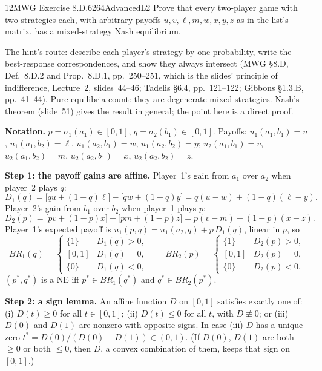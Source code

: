 \begin{exsol}{12}{MWG Exercise 8.D.6}{264}{Advanced}{L2}
\asked Prove that every two-player game with two strategies each, with arbitrary payoffs
$u, v, \ell, m, w, x, y, z$ as in the list's matrix, has a mixed-strategy Nash equilibrium.

\method The hint's route: describe each player's strategy by one probability, write the
best-response correspondences, and show they always intersect (MWG \S8.D, Def.~8.D.2 and
Prop.~8.D.1, pp.~250--251, which is the slides' principle of indifference, Lecture~2,
slides~44--46; Tadelis \S6.4, pp.~121--122; Gibbons \S1.3.B, pp.~41--44). Pure equilibria count:
they are degenerate mixed strategies. Nash's theorem (slide~51) gives the result in general; the
point here is a direct proof.

\solution
\textbf{Notation.} $p = \sigma_1(a_1) \in [0,1]$, $q = \sigma_2(b_1) \in [0,1]$. Payoffs:
$u_1(a_1,b_1) = u$, $u_1(a_1,b_2) = \ell$, $u_1(a_2,b_1) = w$, $u_1(a_2,b_2) = y$;
$u_2(a_1,b_1) = v$, $u_2(a_1,b_2) = m$, $u_2(a_2,b_1) = x$, $u_2(a_2,b_2) = z$.

\textbf{Step 1: the payoff gains are affine.} Player~1's gain from $a_1$ over $a_2$ when player~2
plays $q$:
\[
  D_1(q) = \big[qu + (1-q)\ell\big] - \big[qw + (1-q)y\big] = q(u - w) + (1-q)(\ell - y). \tag{1}
\]
Player~2's gain from $b_1$ over $b_2$ when player~1 plays $p$:
\[
  D_2(p) = \big[pv + (1-p)x\big] - \big[pm + (1-p)z\big] = p(v - m) + (1-p)(x - z). \tag{2}
\]
Player~1's expected payoff is $u_1(p,q) = u_1(a_2,q) + p\,D_1(q)$, linear in $p$, so
\[
  BR_1(q) = \begin{cases} \{1\} & D_1(q) > 0,\\ [0,1] & D_1(q) = 0,\\ \{0\} & D_1(q) < 0,\end{cases}
  \qquad
  BR_2(p) = \begin{cases} \{1\} & D_2(p) > 0,\\ [0,1] & D_2(p) = 0,\\ \{0\} & D_2(p) < 0.\end{cases} \tag{3}
\]
$(p^*, q^*)$ is a NE iff $p^* \in BR_1(q^*)$ and $q^* \in BR_2(p^*)$.

\textbf{Step 2: a sign lemma.} An affine function $D$ on $[0,1]$ satisfies exactly one of:
(i) $D(t) \ge 0$ for all $t \in [0,1]$; (ii) $D(t) \le 0$ for all $t$, with $D \not\equiv 0$; or
(iii) $D(0)$ and $D(1)$ are nonzero with opposite signs. In case (iii) $D$ has a unique zero
$t^* = D(0)/(D(0) - D(1)) \in (0,1)$. (If $D(0)$, $D(1)$ are both $\ge 0$ or both $\le 0$, then
$D$, a convex combination of them, keeps that sign on $[0,1]$.)


\end{exsol}
